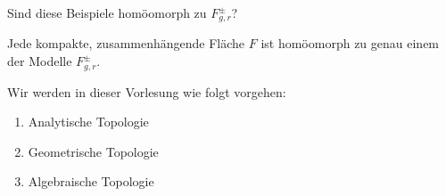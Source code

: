\begin{ex}
	Sind diese Beispiele homöomorph zu $F_{g,r}^{\pm}$?
\end{ex}

\begin{st}
	Jede kompakte, zusammenhängende Fläche $F$ ist homöomorph zu genau einem der Modelle $F_{g,r}^\pm$.
\end{st}

Wir werden in dieser Vorlesung wie folgt vorgehen:

\begin{enumerate}[1.]
	\item
		Analytische Topologie
	\item
		Geometrische Topologie
	\item
		Algebraische Topologie
\end{enumerate}

